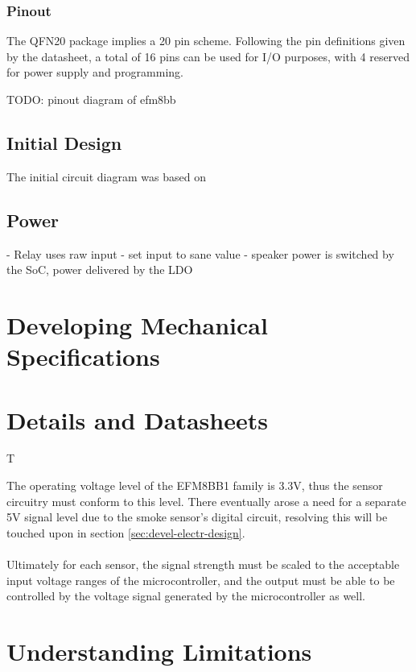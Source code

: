 \documentclass[12pt]{article}
\begin{document}
  
  \subsubsection{Pinout}
  The QFN20 package implies a 20 pin scheme. Following the pin definitions given by the datasheet, a total of 16 pins can be used for I/O purposes, with 4 reserved for power supply and programming.

  

  TODO: pinout diagram of efm8bb

  \subsection{Initial Design}

  The initial circuit diagram was based on 

	\subsection{Power}
  

  - Relay uses raw input - set input to sane value
  - speaker power is switched by the SoC, power delivered by the LDO
	
	\section{Developing Mechanical Specifications}
	
	\section{Details and Datasheets}
  T

  The operating voltage level of the EFM8BB1 family is 3.3V, thus the sensor circuitry must conform to this level. There eventually arose a need for a separate 5V signal level due to the smoke sensor's digital circuit, resolving this will be touched upon in section \ref{sec:devel-electr-design}.

  \paragraph{}
  Ultimately for each sensor, the signal strength must be scaled to the acceptable input voltage ranges of the microcontroller, and the output must be able to be controlled by the voltage signal generated by the microcontroller as well.
	\section{Understanding Limitations}
\end{document}

